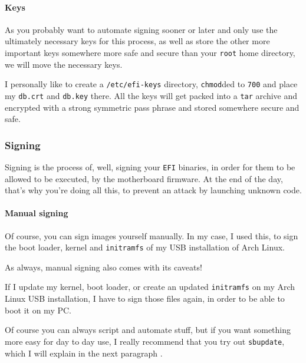 \documentclass[10pt]{dustdoc}
\begin{document}
\paragraph{Keys}%
\label{par:keys}

As you probably want to automate signing sooner or later and only use the ultimately necessary keys for this process, as well as store the other more important keys somewhere more safe and secure than your \texttt{root} home directory, we will move the necessary keys.

I personally like to create a \texttt{/etc/efi-keys} directory, \texttt{chmod}ded to \texttt{700} and place my \texttt{db.crt} and \texttt{db.key} there.
All the keys will get packed into a \texttt{tar} archive and encrypted with a strong symmetric pass phrase and stored somewhere secure and safe.

\subsubsection{Signing}%
\label{sec:signing}

Signing is the process of, well, signing your \texttt{EFI} binaries, in order for them to be allowed to be executed, by the motherboard firmware.
At the end of the day, that’s why you’re doing all this, to prevent an attack by launching unknown code.

\paragraph{Manual signing}%
\label{par:manual-signing}

Of course, you can sign images yourself manually.
In my case, I used this, to sign the boot loader, kernel and \texttt{initramfs} of my USB installation of Arch Linux.

\begin{NOTE}
    As always, manual signing also comes with its caveats!

    If I update my kernel, boot loader, or create an updated \texttt{initramfs} on my Arch Linux USB installation, I have to sign those files again, in order to be able to boot it on my PC.\@

    Of course you can always script and automate stuff, but if you want something more easy for day to day use, I really recommend that you try out \texttt{sbupdate},  which I will explain in the next paragraph .
\end{NOTE}
\end{document}
